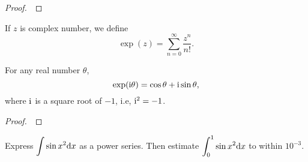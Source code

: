 \begin{proof}
\,
\vspace{3.7in}

\end{proof}

\newpage


\begin{definition}
If $z$ is complex number, we define
\begin{equation*}
\exp(z) = \sum_{n=0}^\infty \frac{z^n}{n!}.
\end{equation*}
\end{definition}

\begin{theorem}
For any real number $\theta$,
\begin{equation*}
\exp(\mathrm{i}\theta) = \cos\theta + \mathrm{i}\sin\theta,
\end{equation*}
where $\mathrm{i}$ is a square root of $-1$, i.e, $\mathrm{i}^2=-1$.
\end{theorem}

\begin{proof}
\,
\vspace{4.5in}

\end{proof}

\newpage

\begin{example}
Express $\displaystyle\int\sin x^2\mathrm{d} x$ as a power series.
Then estimate $\displaystyle\int_0^1\sin x^2\mathrm{d} x$ to within $10^{-3}$.
\end{example}
